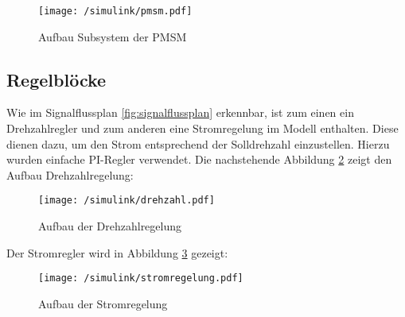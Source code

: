 \begin{figure}[h]
	\centering
	\texttt{[image: /simulink/pmsm.pdf]}
	\label{fig:pmsm}
	\caption{Aufbau Subsystem der PMSM}
\end{figure}

\subsection{Regelblöcke}

Wie im Signalflussplan \ref{fig:signalflussplan} erkennbar, ist zum einen ein Drehzahlregler und zum anderen eine Stromregelung im Modell enthalten. 
Diese dienen dazu, um den Strom entsprechend der Solldrehzahl einzustellen.
Hierzu wurden einfache PI-Regler verwendet.
Die nachstehende Abbildung \ref{fig:drehzahl} zeigt den Aufbau Drehzahlregelung:

\begin{figure}[h]
	\centering
	\texttt{[image: /simulink/drehzahl.pdf]}
	\label{fig:drehzahl}
	\caption{Aufbau der Drehzahlregelung}
\end{figure}

Der Stromregler wird in Abbildung \ref{fig:stromregelung} gezeigt:

\begin{figure}[h]
	\centering
	\texttt{[image: /simulink/stromregelung.pdf]}
	\label{fig:stromregelung}
	\caption{Aufbau der Stromregelung}
\end{figure}

